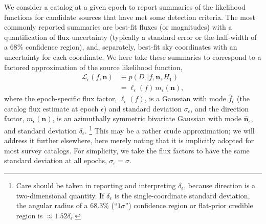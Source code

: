 \documentclass[twocolumn]{emulateapj}
\newcommand{\eind}{\epsilon}  %
\newcommand{\edata}{D_\eind}  %
\newcommand{\like}{\mathcal{L}}  %
\newcommand{\flike}{\ell}  %
\newcommand{\dlike}{m}  %
\newcommand{\flux}{f}
\newcommand{\fest}{\hat{\flux}}  %
\newcommand{\fsig}{\sigma}  %
\newcommand{\drxn}{\mathbf{n}}
\newcommand{\dest}{\hat{\mathbf{n}}}  %
\newcommand{\dsig}{\delta}  %
\newcommand{\dtxn}{\mathcal{D}}  %
\newcommand{\ndtxn}{\mathcal{N}}  %
\newcommand{\accept}{\mathcal{A}}  %
\newcommand{\fth}{\flux_{\rm th}}
\begin{document}
We consider a catalog at a given epoch to report summaries of the likelihood functions for candidate sources that have met some detection criteria.
The most commonly reported summaries are best-fit fluxes (or magnitudes) with a quantification of flux uncertainty (typically a standard error or the half-width of a 68\% confidence region), and, separately, best-fit sky coordinates with an uncertainty for each coordinate.%
We here take these summaries to correspond to a factored approximation of the source likelihood function,
\begin{align} \label{eq:eplike}
\like_\eind(\flux, \drxn)
  &\equiv p(\edata|\flux, \drxn, H_1)\nonumber\\
  &= \flike_\eind(\flux)\, \dlike_\eind(\drxn),
\end{align}
where the epoch-specific flux factor, $\flike_\eind(\flux)$, is a Gaussian with mode $\fest_\eind$ (the catalog flux estimate at epoch $\eind$) and standard deviation $\fsig_\eind$, and the direction factor, $\dlike_\eind(\drxn)$, is an azimuthally symmetric bivariate Gaussian with mode $\dest_\eind$, and standard deviation $\dsig_\eind$.%
\footnote{Care should be taken in reporting and interpreting $\dsig_\eind$, because direction is a two-dimensional quantity.
If $\dsig_\eind$ is the single-coordinate standard deviation, the angular radius of a 68.3\% (``$1\sigma$'') confidence region or flat-prior credible region is $\approx 1.52\dsig_\eind$.}
This may be a rather crude approximation; we will address it further elsewhere, here merely noting that it is implicitly adopted for most survey catalogs.
For simplicity, we take the flux factors to have the same standard deviation at all epochs,  $\fsig_\eind = \sigma$.




\end{document}
